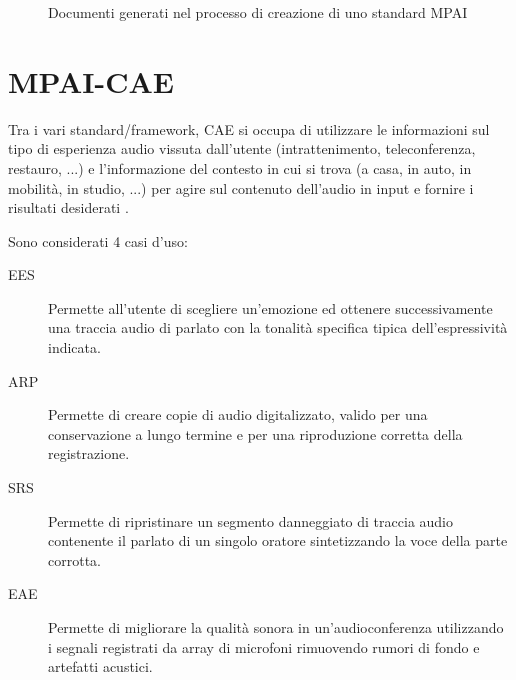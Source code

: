 \begin{figure}[H]
    \centering
    \begin{adjustbox}{width=\textwidth}
    \end{adjustbox}
    \caption{Documenti generati nel processo di creazione di uno standard \ac{MPAI}}
    \label{fig:mpai-processo-standard}
\end{figure}


\section{MPAI-CAE} \label{sec:mpai-cae}
Tra i vari standard/framework, \ac{CAE} si occupa di utilizzare le informazioni sul tipo di esperienza audio vissuta dall'utente (intrattenimento, teleconferenza, restauro, ...) e l'informazione del contesto in cui si trova (a casa, in auto, in mobilità, in studio, ...) per agire sul contenuto dell'audio in input e fornire i risultati desiderati \cite{mpaiMPAICAE}.

Sono considerati 4 casi d'uso:
\begin{description}
    \item[\ac{EES}] Permette all'utente di scegliere un'emozione ed ottenere successivamente una traccia audio di parlato con la tonalità specifica tipica dell'espressività indicata.
    \item[\ac{ARP}] Permette di creare copie di audio digitalizzato, valido per una conservazione a lungo termine e per una riproduzione corretta della registrazione.
    \item[\ac{SRS}] Permette di ripristinare un segmento danneggiato di traccia audio contenente il parlato di un singolo oratore sintetizzando la voce della parte corrotta.
    \item[\ac{EAE}] Permette di migliorare la qualità sonora in un'audioconferenza utilizzando i segnali registrati da array di microfoni rimuovendo rumori di fondo e artefatti acustici.
\end{description}

